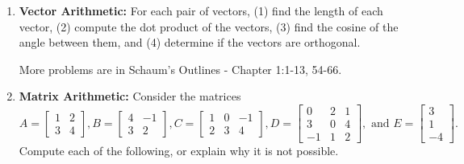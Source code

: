 \begin{enumerate}


\item \textbf{Vector Arithmetic:} For each pair of vectors, (1) find the length of each vector, (2) compute the dot product of the vectors, (3) find the cosine of the angle between them, and (4) determine if the vectors are orthogonal.
\begin{enumerate}
\end{enumerate}
More problems are in Schaum's Outlines - 
Chapter 1:1-13,  54-66.
\item \textbf{Matrix Arithmetic:} Consider the matrices
$$
A=
\begin{bmatrix}
 1 & 2 \\
 3 & 4
\end{bmatrix}
,
B=
\begin{bmatrix}
 4 & -1 \\
 3 & 2
\end{bmatrix}
,
C=
\begin{bmatrix}
 1 & 0 & -1 \\
 2 & 3 & 4
\end{bmatrix}
,
D=
\begin{bmatrix}
 0 & 2 & 1 \\
 3 & 0 & 4 \\
 -1 & 1 & 2
\end{bmatrix}
, \text{ and }
E=
\begin{bmatrix}
 3 \\
 1 \\
 -4
\end{bmatrix}.
$$
Compute each of the following, or explain why it is not possible.
\begin{enumerate}
\end{enumerate}
\end{enumerate}
